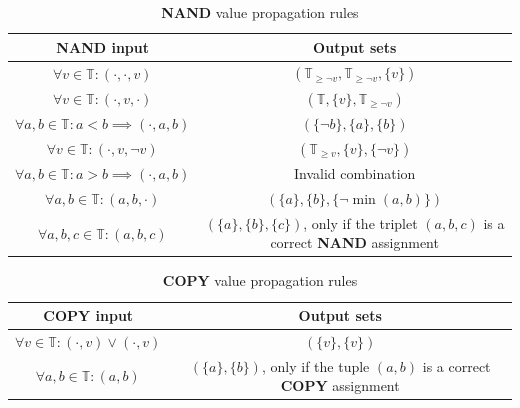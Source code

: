 \begin{table}[h!]
    \centering
    \begin{tabular}{|c|c|}
        \hline
        \rowcolor[HTML]{EAE1E1}
        {\color[HTML]{333333} \textbf{NAND input}}        & {\color[HTML]{333333} \textbf{Output sets}}                                                   \\ \hline
        $\forall v \in \mathbb{T}: (\cdot, \cdot, v)$     & $(\mathbb{T}_{\geq \neg v},\mathbb{T}_{\geq \neg v}, \{v\} )$                                 \\ \hline
        $\forall v \in \mathbb{T}: (\cdot, v, \cdot)$     & $(\mathbb{T}, \{v\}, \mathbb{T}_{\geq \neg v})$                                               \\ \hline
        $\forall a,b \in \mathbb{T}: a < b \implies (\cdot, a, b)$ & $(\{\neg b\}, \{a\}, \{b\})$                                                                  \\ \hline
        $\forall v \in \mathbb{T}: (\cdot, v, \neg v)$    & $(\mathbb{T}_{\geq v}, \{v\}, \{\neg v\})$                                                    \\ \hline
        $\forall a,b \in \mathbb{T}:a > b \implies (\cdot, a, b)$  & Invalid combination                                                                           \\ \hline
        $\forall a,b \in \mathbb{T}: (a, b, \cdot)$  & $(\{a\}, \{b\}, \{\neg \min(a,b) \})$                                                         \\ \hline
        $\forall a,b,c \in \mathbb{T}:  (a, b, c)$        & $(\{a\}, \{b\}, \{c \})$, only if the triplet $(a,b,c)$ is a correct \textbf{NAND} assignment \\ \hline
    \end{tabular}
    \caption{\textbf{NAND} value propagation rules}
    \label{tab:chap-4:nand-propagation}
\end{table}


\begin{table}[h!]
    \centering
    \begin{tabular}{|c|c|}
        \hline
        \rowcolor[HTML]{EAE1E1}
        {\color[HTML]{333333} \textbf{COPY input}}             & {\color[HTML]{333333} \textbf{Output sets}}                                       \\ \hline
        $\forall v \in \mathbb{T}: (\cdot, v) \vee (\cdot, v)$ & $(\{v\}, \{v\})$                                                                  \\ \hline
        $\forall a,b \in \mathbb{T}:  (a, b)$                  & $(\{a\}, \{b\})$, only if the tuple $(a,b)$ is a correct \textbf{COPY} assignment \\ \hline
    \end{tabular}
    \caption{\textbf{COPY} value propagation rules}
    \label{tab:chap-4:copy-propagation}
\end{table}

